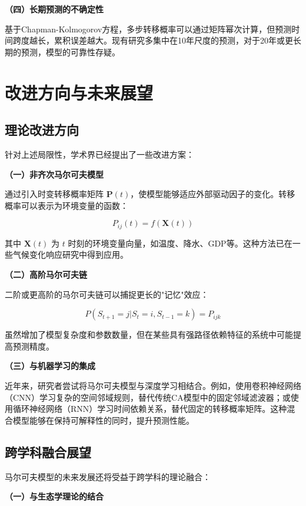 \documentclass[a4paper,12pt]{ctexart}
\begin{document}
\textbf{（四）长期预测的不确定性}

基于Chapman-Kolmogorov方程，多步转移概率可以通过矩阵幂次计算，但预测时间跨度越长，累积误差越大。现有研究多集中在10年尺度的预测，对于20年或更长期的预测，模型的可靠性存疑。


\section{改进方向与未来展望}

\subsection{理论改进方向}

针对上述局限性，学术界已经提出了一些改进方案：

\textbf{（一）非齐次马尔可夫模型}

通过引入时变转移概率矩阵 $\mathbf{P}(t)$，使模型能够适应外部驱动因子的变化。转移概率可以表示为环境变量的函数：

\begin{equation}
    P_{ij}(t) = f(\mathbf{X}(t))
\end{equation}

其中 $\mathbf{X}(t)$ 为 $t$ 时刻的环境变量向量，如温度、降水、GDP等。这种方法已在一些气候变化响应研究中得到应用。

\textbf{（二）高阶马尔可夫链}

二阶或更高阶的马尔可夫链可以捕捉更长的"记忆"效应：

\begin{equation}
    P(S_{t+1} = j | S_t = i, S_{t-1} = k) = P_{ijk}
\end{equation}

虽然增加了模型复杂度和参数数量，但在某些具有强路径依赖特征的系统中可能提高预测精度。

\textbf{（三）与机器学习的集成}

近年来，研究者尝试将马尔可夫模型与深度学习相结合。例如，使用卷积神经网络（CNN）学习复杂的空间邻域规则，替代传统CA模型中的固定邻域滤波器；或使用循环神经网络（RNN）学习时间依赖关系，替代固定的转移概率矩阵。这种混合模型能够在保持可解释性的同时，提升预测性能。

\subsection{跨学科融合展望}

马尔可夫模型的未来发展还将受益于跨学科的理论融合：

\textbf{（一）与生态学理论的结合}
\end{document}
